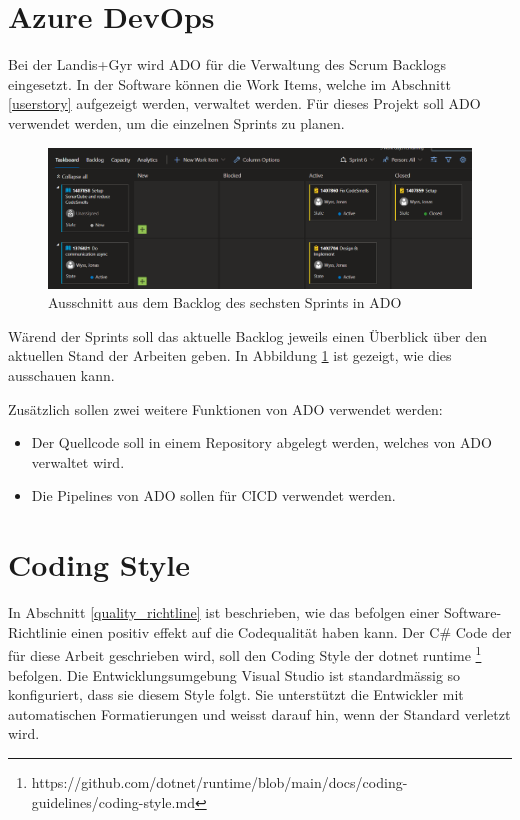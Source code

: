 \section{Azure DevOps}\label{methoden:ADO}
Bei der Landis+Gyr wird \ac{ADO} für die Verwaltung des Scrum Backlogs eingesetzt.
In der Software können die Work Items, welche im Abschnitt \ref{userstory} aufgezeigt werden, verwaltet werden.
Für dieses Projekt soll \ac{ADO} verwendet werden, um die einzelnen Sprints zu planen.
\begin{figure}[H]
   \centering
   \includegraphics[width=1.0\textwidth]{gfx/ado.png}
   \caption{
         Ausschnitt aus dem Backlog des sechsten Sprints in \ac{ADO}
      }
      \label{fig:adosprint6}
\end{figure}
Wärend der Sprints soll das aktuelle Backlog jeweils einen Überblick über den aktuellen Stand der Arbeiten geben.
In Abbildung \ref{fig:adosprint6} ist gezeigt, wie dies ausschauen kann.

Zusätzlich sollen zwei weitere Funktionen von \ac{ADO} verwendet werden:
\begin{itemize}
   \item Der Quellcode soll in einem Repository abgelegt werden, welches von \ac{ADO} verwaltet wird.
   \item Die Pipelines von \ac{ADO} sollen für \ac{CICD} verwendet werden.
\end{itemize}

\section{Coding Style}\label{codingStandard}
In Abschnitt \ref{quality_richtline} ist beschrieben, wie das befolgen einer Software-Richtlinie einen positiv effekt auf die Codequalität haben kann.
Der C\# Code der für diese Arbeit geschrieben wird, soll den Coding Style der dotnet runtime \footnote{https://github.com/dotnet/runtime/blob/main/docs/coding-guidelines/coding-style.md} befolgen.
Die Entwicklungsumgebung Visual Studio ist standardmässig so konfiguriert, dass sie diesem Style folgt.
Sie unterstützt die Entwickler mit automatischen Formatierungen und weisst darauf hin, wenn der Standard verletzt wird. 

